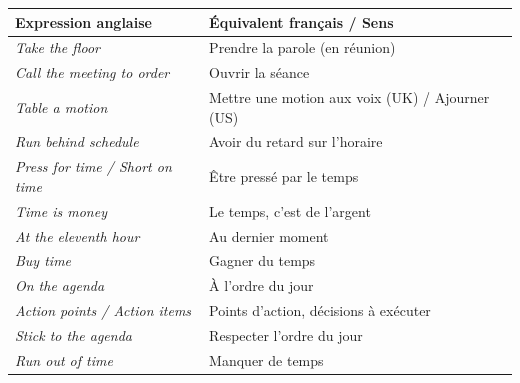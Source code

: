 \documentclass[11pt]{article}
\newcommand{\eng}[1]{\ifmmode\text{\textit{#1}}\else\begingroup\selectlanguage{english}\itshape #1\endgroup\fi}
\begin{document}
\begin{definition}
\begin{center}
\begin{tabularx}{\linewidth}{|X|X|}\hline
\rowcolor{poppurpleL} \textbf{Expression anglaise} & \textbf{Équivalent français / Sens} \\ \hline
\eng{Take the floor} & Prendre la parole (en réunion) \\ \hline
\eng{Call the meeting to order} & Ouvrir la séance \\ \hline
\eng{Table a motion} & Mettre une motion aux voix (UK) / Ajourner (US) \\ \hline
\eng{Run behind schedule} & Avoir du retard sur l'horaire \\ \hline
\eng{Press for time} / \eng{Short on time} & Être pressé par le temps \\ \hline
\eng{Time is money} & Le temps, c'est de l'argent \\ \hline
\eng{At the eleventh hour} & Au dernier moment \\ \hline
\eng{Buy time} & Gagner du temps \\ \hline
\eng{On the agenda} & À l'ordre du jour \\ \hline
\eng{Action points} / \eng{Action items} & Points d'action, décisions à exécuter \\ \hline
\eng{Stick to the agenda} & Respecter l'ordre du jour \\ \hline
\eng{Run out of time} & Manquer de temps \\ \hline
\end{tabularx}
\end{center}
\end{definition}
\end{document}
